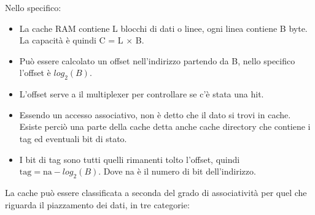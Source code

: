 \documentclass{article}
\begin{document}
Nello specifico:
\begin{itemize}
    \item La cache RAM contiene L blocchi di dati o linee, ogni linea contiene B byte. La capacità è quindi C = L $\times$ B.
    \item Può essere calcolato un offset nell'indirizzo partendo da B, nello specifico l'offset è $log_2(B)$.
    \item L'offset serve a il multiplexer per controllare se c'è stata una hit.
    \item Essendo un accesso associativo, non è detto che il dato si trovi in cache. Esiste perciò una parte della cache detta anche cache directory che contiene i tag ed eventuali bit di stato.
    \item I bit di tag sono tutti quelli rimanenti tolto l'offset, quindi $\text{tag} = \text{na} - log_2(B)$. Dove na è il numero di bit dell'indirizzo.
\end{itemize}
La cache può essere classificata a seconda del grado di associatività per quel che riguarda il piazzamento dei dati, in tre categorie:
\end{document}
